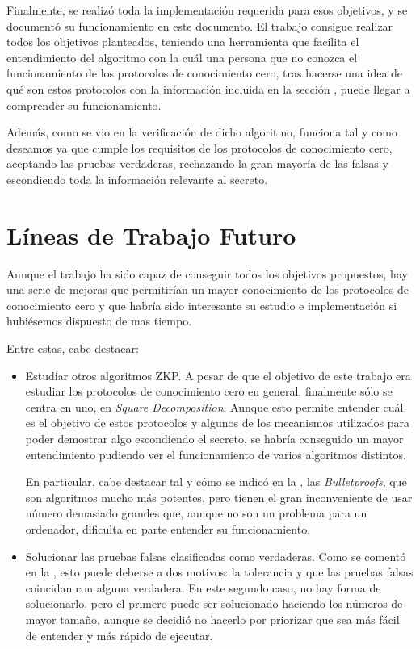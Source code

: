 Finalmente, se realizó toda la implementación requerida para esos objetivos, y se documentó su funcionamiento en este documento. El trabajo consigue realizar todos los objetivos planteados, teniendo una herramienta que facilita el entendimiento del algoritmo con la cuál una persona que no conozca el funcionamiento de los protocolos de conocimiento cero, tras hacerse una idea de qué son estos protocolos con la información incluida en la sección , puede llegar a comprender su funcionamiento.

Además, como se vio en la verificación de dicho algoritmo, funciona tal y como deseamos ya que cumple los requisitos de los protocolos de conocimiento cero, aceptando las pruebas verdaderas, rechazando la gran mayoría de las falsas y escondiendo toda la información relevante al secreto.

\section{Líneas de Trabajo Futuro}

Aunque el trabajo ha sido capaz de conseguir todos los objetivos propuestos, hay una serie de mejoras que permitirían un mayor conocimiento de los protocolos de conocimiento cero y que habría sido interesante su estudio e implementación si hubiésemos dispuesto de mas tiempo.

Entre estas, cabe destacar:
\begin{itemize}
    \item Estudiar otros algoritmos ZKP. A pesar de que el objetivo de este trabajo era estudiar los protocolos de conocimiento cero en general, finalmente sólo se centra en uno, en \emph{Square Decomposition}. Aunque esto permite entender cuál es el objetivo de estos protocolos y algunos de los mecanismos utilizados para poder demostrar algo escondiendo el secreto, se habría conseguido un mayor entendimiento pudiendo ver el funcionamiento de varios algoritmos distintos.

    En particular, cabe destacar tal y cómo se indicó en la , las \emph{Bulletproofs}, que son algoritmos mucho más potentes, pero tienen el gran inconveniente de usar número demasiado grandes que, aunque no son un problema para un ordenador, dificulta en parte entender su funcionamiento.

    \item Solucionar las pruebas falsas clasificadas como verdaderas. Como se comentó en la , esto puede deberse a dos motivos: la tolerancia y que las pruebas falsas coincidan con alguna verdadera. En este segundo caso, no hay forma de solucionarlo, pero el primero puede ser solucionado haciendo los números de mayor tamaño, aunque se decidió no hacerlo por priorizar que sea más fácil de entender y más rápido de ejecutar.
\end{itemize}